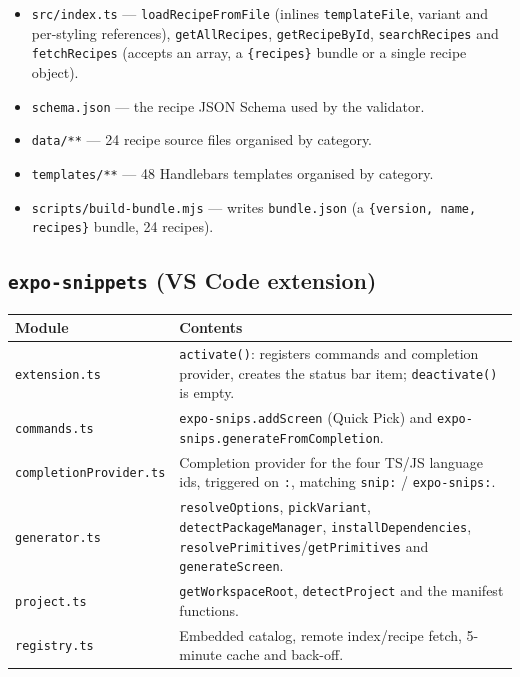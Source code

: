 \begin{itemize}
  \item \texttt{src/index.ts} --- \texttt{loadRecipeFromFile} (inlines
        \texttt{templateFile}, variant and per-styling references),
        \texttt{getAllRecipes}, \texttt{getRecipeById}, \texttt{searchRecipes} and
        \texttt{fetchRecipes} (accepts an array, a \texttt{\{recipes\}} bundle or a
        single recipe object).
  \item \texttt{schema.json} --- the recipe JSON Schema used by the validator.
  \item \texttt{data/**} --- 24 recipe source files organised by category.
  \item \texttt{templates/**} --- 48 Handlebars templates organised by category.
  \item \texttt{scripts/build-bundle.mjs} --- writes \texttt{bundle.json} (a
        \texttt{\{version, name, recipes\}} bundle, 24 recipes).
\end{itemize}

\subsection*{\texttt{expo-snippets} (VS Code extension)}

\begin{longtable}{p{4.2cm}p{9.8cm}}
\toprule
\textbf{Module} & \textbf{Contents} \\
\midrule
\endhead
\texttt{extension.ts} & \texttt{activate()}: registers commands and completion
provider, creates the status bar item; \texttt{deactivate()} is empty. \\
\texttt{commands.ts} & \texttt{expo-snips.addScreen} (Quick Pick) and
\texttt{expo-snips.generateFromCompletion}. \\
\texttt{completionProvider.ts} & Completion provider for the four TS/JS language
ids, triggered on \texttt{:}, matching \texttt{snip:} / \texttt{expo-snips:}. \\
\texttt{generator.ts} & \texttt{resolveOptions}, \texttt{pickVariant},
\texttt{detectPackageManager}, \texttt{installDependencies},
\texttt{resolvePrimitives}/\texttt{getPrimitives} and \texttt{generateScreen}. \\
\texttt{project.ts} & \texttt{getWorkspaceRoot}, \texttt{detectProject} and the
manifest functions. \\
\texttt{registry.ts} & Embedded catalog, remote index/recipe fetch, 5-minute cache
and back-off. \\
\bottomrule
\end{longtable}

